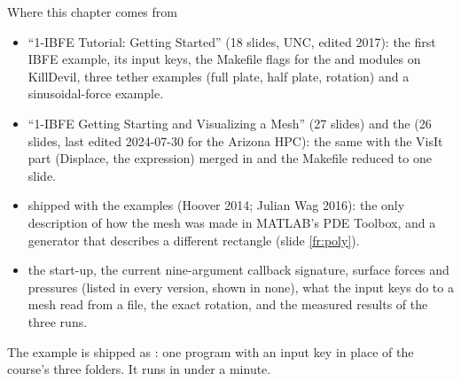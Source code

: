 \documentclass[aspectratio=169,11pt]{beamer}
\begin{document}
\begin{frame}{Where this chapter comes from}
\label{fr:sources}
\footnotesize
\begin{itemize}
  \item {} ``1-IBFE Tutorial: Getting Started'' (18 slides, UNC, edited 2017): the first IBFE example, its input keys, the Makefile flags for the  and  modules on KillDevil, three tether examples (full plate, half plate, rotation) and a sinusoidal-force example.
  \item {} ``1-IBFE Getting Starting and Visualizing a Mesh'' (27 slides) and the  (26 slides, last edited 2024-07-30 for the Arizona HPC): the same with the VisIt part (Displace, the  expression) merged in and the Makefile reduced to one slide.
  \item {} shipped with the examples (Hoover 2014; Julian Wag 2016): the only description of how the  mesh was made in MATLAB's PDE Toolbox, and a  generator that describes a different rectangle (slide \ref{fr:poly}).
  \item {} the  start-up, the current nine-argument callback signature, surface forces and pressures (listed in every version, shown in none), what the input keys do to a mesh read from a file, the exact rotation, and the measured results of the three runs.
\end{itemize}
\begin{punchbox}
\footnotesize The example is shipped as : one program with an input key  in place of the course's three folders. It runs in under a minute.
\end{punchbox}
\end{frame}
\end{document}
